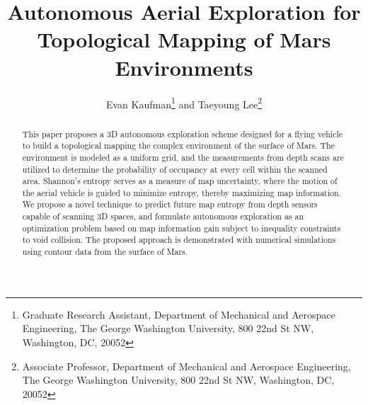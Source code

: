 \documentclass[conf]{new-aiaa}
\title{Autonomous Aerial Exploration for Topological Mapping of Mars Environments}
\author{Evan Kaufman\footnote{Graduate Research Assistant, Department of Mechanical and Aerospace Engineering, The George Washington University, 800 22nd St NW, Washington, DC, 20052} and Taeyoung Lee\footnote{Associate Professor, Department of Mechanical and Aerospace Engineering, The George Washington University, 800 22nd St NW, Washington, DC, 20052}}%
\affil{The George Washington University, Washington, DC, 20052}
\begin{document}
\maketitle

\begin{abstract}
This paper proposes a 3D autonomous exploration scheme designed for a flying vehicle to build a topological mapping the complex environment of the surface of Mars. 
The environment is modeled as a uniform grid, and the measurements from depth scans are utilized to determine the probability of occupancy at every cell within the scanned area. 
Shannon's entropy serves as a measure of map uncertainty, where the motion of the aerial vehicle is guided to minimize entropy, thereby maximizing map information. We propose a novel technique to predict future map entropy from depth sensors capable of scanning 3D spaces, and formulate autonomous exploration as an optimization problem based on map information gain subject to inequality constraints to void collision. The proposed approach is demonstrated with numerical simulations using contour data from the surface of Mars.
\end{abstract}

%
\end{document}
